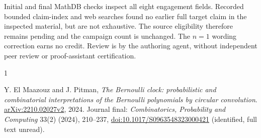 \documentclass[11pt]{article}
\begin{document}
Initial and final MathDB checks inspect all eight engagement fields.
Recorded bounded claim-index and web searches found no earlier full
target claim in the inspected material, but are not exhaustive.
The source eligibility therefore remains pending and the campaign
count is unchanged. The \(n=1\) wording correction earns no credit.
Review is by the authoring agent, without independent peer review or
proof-assistant certification.

\begin{thebibliography}{1}
\raggedright
{}
Y. El Maazouz and J. Pitman,
\emph{The Bernoulli clock: probabilistic and combinatorial interpretations
of the Bernoulli polynomials by circular convolution}.
\href{https://arxiv.org/abs/2210.02027}{arXiv:2210.02027v2}, 2024.
Journal final: \emph{Combinatorics, Probability and Computing}
33(2) (2024), 210--237,
\href{https://doi.org/10.1017/S0963548323000421}{doi:10.1017/S0963548323000421}
(identified, full text unread).
\end{thebibliography}
\end{document}
